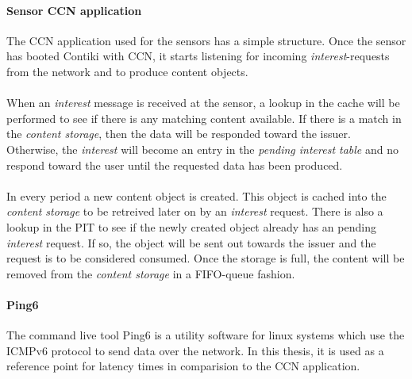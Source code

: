 \paragraph{Sensor CCN application}
The CCN application used for the sensors has a simple structure. Once the sensor has booted Contiki with CCN, it starts listening for incoming \textit{interest}-requests from the network and to produce content objects.\\\\
When an \textit{interest} message is received at the sensor, a lookup in the cache will be performed to see if there is any matching content available. If there is a match in the \textit{content storage}, then the data will be responded toward the issuer. Otherwise, the \textit{interest} will become an entry in the \textit{pending interest table} and no respond toward the user until the requested data has been produced.\\\\
In every period a new content object is created. This object is cached into the \textit{content storage} to be retreived later on by an \textit{interest} request. There is also a lookup in the PIT to see if the newly created object already has an pending \textit{interest} request. If so, the object will be sent out towards the issuer and the request is to be considered consumed. Once the storage is full, the content will be removed from the \textit{content storage} in a FIFO-queue fashion.


\paragraph{Ping6}
The command live tool Ping6 is a utility software for linux systems which use the ICMPv6 protocol to send data over the network. In this thesis, it is used as a reference point for latency times in comparision to the CCN application.




